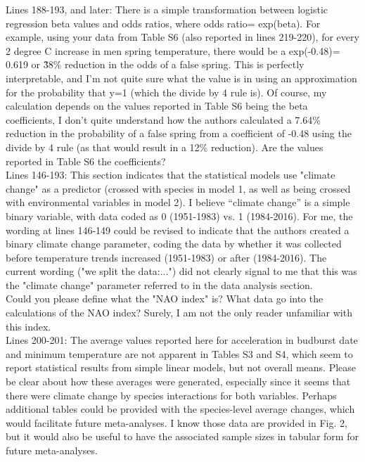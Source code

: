 \documentclass[11pt,a4paper]{article}
\begin{document}
Lines 188-193, and later: There is a simple transformation between logistic regression beta values and odds ratios, where odds ratio= exp(beta). For example, using your data from Table S6 (also reported in lines 219-220), for every 2 degree C increase in men spring temperature, there would be a exp(-0.48)= 0.619 or \~38\% reduction in the odds of a false spring. This is perfectly interpretable, and I’m not quite sure what the value is in using an approximation for the probability that y=1 (which the divide by 4 rule is). Of course, my calculation depends on the values reported in Table S6 being the beta coefficients, I don’t quite understand how the authors calculated a 7.64\% reduction in the probability of a false spring from a coefficient of -0.48 using the divide by 4 rule (as that would result in a 12\% reduction). Are the values reported in Table S6 the coefficients?\\

Lines 146-193: This section indicates that the statistical models use "climate change" as a predictor (crossed with species in model 1, as well as being crossed with environmental variables in model 2). I believe “climate change” is a simple binary variable, with data coded as 0 (1951-1983) vs. 1 (1984-2016). For me, the wording at lines 146-149 could be revised to indicate that the authors created a binary climate change parameter, coding the data by whether it was collected before temperature trends increased (1951-1983) or after (1984-2016). The current wording ("we split the data:...") did not clearly signal to me that this was the "climate change" parameter referred to in the data analysis section. \\

Could you please define what the "NAO index" is? What data go into the calculations of the NAO index? Surely, I am not the only reader unfamiliar with this index.\\


Lines 200-201: The average values reported here for acceleration in budburst date and minimum temperature are not apparent in Tables S3 and S4, which seem to report statistical results from simple linear models, but not overall means. Please be clear about how these averages were generated, especially since it seems that there were climate change by species interactions for both variables. Perhaps additional tables could be provided with the species-level average changes, which would facilitate future meta-analyses. I know those data are provided in Fig. 2, but it would also be useful to have the associated sample sizes in tabular form for future meta-analyses.\\
\end{document}
